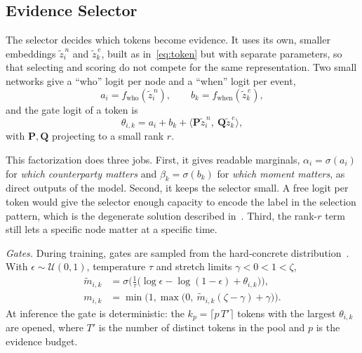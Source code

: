 \documentclass[pdflatex,sn-basic]{sn-jnl}
\theoremstyle{definition}
\theoremstyle{plain}
\begin{document}
\subsection{Evidence Selector}
The selector decides which tokens become evidence. It uses its own, smaller
embeddings $\tilde{z}^{\,n}_i$ and $\tilde{z}^{\,e}_k$, built as
in~\eqref{eq:token} but with separate parameters, so that selecting and scoring
do not compete for the same representation. Two small networks give a ``who''
logit per node and a ``when'' logit per event,
\begin{equation}
a_i=f_{\text{who}}(\tilde{z}^{\,n}_i),\qquad
b_k=f_{\text{when}}(\tilde{z}^{\,e}_k),
\end{equation}
and the gate logit of a token is
\begin{equation}
\theta_{i,k}=a_i+b_k+\langle\mathbf{P}\tilde{z}^{\,n}_i,\ \mathbf{Q}\tilde{z}^{\,e}_k\rangle,
\label{eq:theta}
\end{equation}
with $\mathbf{P},\mathbf{Q}$ projecting to a small rank $r$.

This factorization does three jobs. First, it gives readable marginals,
$\alpha_i=\sigma(a_i)$ for \emph{which counterparty matters} and
$\beta_k=\sigma(b_k)$ for \emph{which moment matters}, as direct outputs of the
model. Second, it keeps the selector small. A free logit per token would give
the selector enough capacity to encode the label in the selection pattern,
which is the degenerate solution described in~\cite{interlocking}. Third, the
rank-$r$ term still lets a specific node matter at a specific time.

\emph{Gates.} During training, gates are sampled from the hard-concrete
distribution~\cite{l0}. With $\epsilon\sim\mathcal{U}(0,1)$, temperature $\tau$
and stretch limits $\gamma<0<1<\zeta$,
\begin{align}
\tilde{m}_{i,k}&=\sigma\!\Big(\tfrac{1}{\tau}\big(\log\epsilon-\log(1-\epsilon)
+\theta_{i,k}\big)\Big),\\
m_{i,k}&=\min\!\big(1,\max\!\big(0,\ \tilde{m}_{i,k}(\zeta-\gamma)+\gamma\big)\big).
\label{eq:gate}
\end{align}
At inference the gate is deterministic: the $k_p=\lceil p\,T'\rceil$ tokens
with the largest $\theta_{i,k}$ are opened, where $T'$ is the number of
distinct tokens in the pool and $p$ is the evidence budget.
\end{document}
